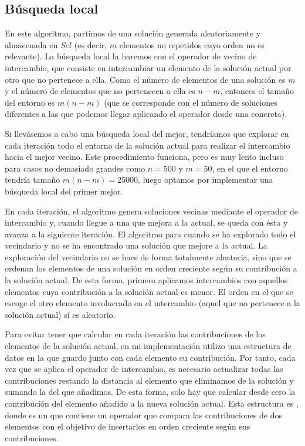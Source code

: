 \documentclass[10pt,a4paper]{article}
\begin{document}
\subsection{Búsqueda local}

En este algoritmo, partimos de una solución generada aleatoriamente y almacenada en $Sel$ (es decir, $m$ elementos no repetidos cuyo orden no es relevante). La búsqueda local la haremos con el operador de vecino de intercambio, que consiste en intercambiar un elemento de la solución actual por otro que no pertenece a ella. Como el número de elementos de una solución es $m$ y el número de elementos que no pertenecen a ella es $n-m$, entonces el tamaño del entorno es $m(n-m)$ (que se corresponde con el número de soluciones diferentes a las que podemos llegar aplicando el operador desde una concreta).

Si llevásemos a cabo una búsqueda local del mejor, tendríamos que explorar en cada iteración todo el entorno de la solución actual para realizar el intercambio hacia el mejor vecino. Este procedimiento funciona, pero es muy lento incluso para casos no demasiado grandes como $n=500$ y $m=50$, en el que el entorno tendría tamaño $m(n-m)=25000$, luego optamos por implementar una búsqueda local del primer mejor.

En cada iteración, el algoritmo genera soluciones vecinas mediante el operador de intercambio y, cuando llegue a una que mejora a la actual, se queda con ésta y avanza a la siguiente iteración. El algoritmo para cuando se ha explorado todo el vecindario y no se ha encontrado una solución que mejore a la actual. La exploración del vecindario no se hace de forma totalmente aleatoria, sino que se ordenan los elementos de una solución en orden creciente según su contribución a la solución actual. De esta forma, primero aplicamos intercambios con aquellos elementos cuya contribución a la solución actual es menor. El orden en el que se escoge el otro elemento involucrado en el intercambio (aquel que no pertenece a la solución actual) sí es aleatorio.

Para evitar tener que calcular en cada iteración las contribuciones de los elementos de la solución actual, en mi implementación utilizo una estructura de datos en la que guardo junto con cada elemento su contribución. Por tanto, cada vez que se aplica el operador de intercambio, es necesario actualizar todas las contribuciones restando la distancia al elemento que eliminamos de la solución y sumando la del que añadimos. De esta forma, solo hay que calcular desde cero la contribución del elemento añadido a la nueva solución actual. Esta estructura es , donde  es un  que contiene un operador que compara las contribuciones de dos elementos con el objetivo de insertarlos en orden creciente según sus contribuciones.
\end{document}
